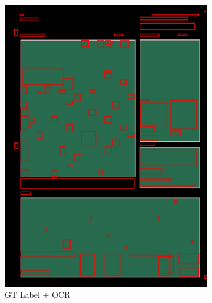\documentclass[aspectratio=1610]{beamer}
\begin{document}
\begin{frame}
\begin{figure}
\begin{subfigure}{.25\textwidth}
  \includegraphics[width=0.99\linewidth, clip=true, trim = 0mm 0mm 0mm 0mm]{figures/ocr_bbox/y3LXnnL.jpg}
  \caption{GT Label + OCR}
\end{subfigure}%
\begin{subfigure}{.25\textwidth}
  \centering

\end{subfigure}
\end{figure}
\end{frame}
\end{document}
